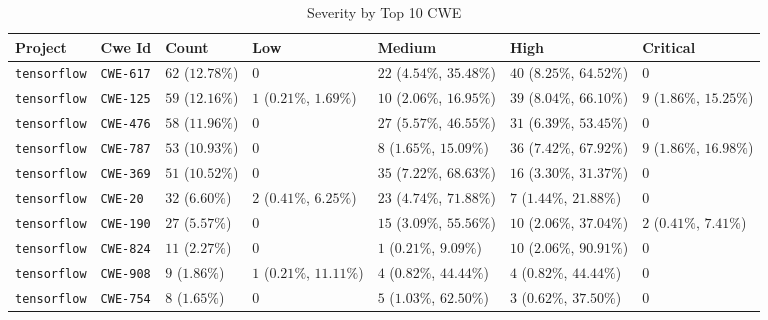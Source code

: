 \begin{table}
\caption{Severity by Top 10 CWE}
\label{tab:cwe-distribution}
\begin{tabular}{lllllll}
\toprule
Project & Cwe Id & Count & Low & Medium & High & Critical \\
\midrule
\texttt{tensorflow} & \texttt{CWE-617} & $62$ ($12.78\%$) & $0$ & $22$ ($4.54\%$, $35.48\%$) & $40$ ($8.25\%$, $64.52\%$) & $0$ \\
\texttt{tensorflow} & \texttt{CWE-125} & $59$ ($12.16\%$) & $1$ ($0.21\%$, $1.69\%$) & $10$ ($2.06\%$, $16.95\%$) & $39$ ($8.04\%$, $66.10\%$) & $9$ ($1.86\%$, $15.25\%$) \\
\texttt{tensorflow} & \texttt{CWE-476} & $58$ ($11.96\%$) & $0$ & $27$ ($5.57\%$, $46.55\%$) & $31$ ($6.39\%$, $53.45\%$) & $0$ \\
\texttt{tensorflow} & \texttt{CWE-787} & $53$ ($10.93\%$) & $0$ & $8$ ($1.65\%$, $15.09\%$) & $36$ ($7.42\%$, $67.92\%$) & $9$ ($1.86\%$, $16.98\%$) \\
\texttt{tensorflow} & \texttt{CWE-369} & $51$ ($10.52\%$) & $0$ & $35$ ($7.22\%$, $68.63\%$) & $16$ ($3.30\%$, $31.37\%$) & $0$ \\
\texttt{tensorflow} & \texttt{CWE-20} & $32$ ($6.60\%$) & $2$ ($0.41\%$, $6.25\%$) & $23$ ($4.74\%$, $71.88\%$) & $7$ ($1.44\%$, $21.88\%$) & $0$ \\
\texttt{tensorflow} & \texttt{CWE-190} & $27$ ($5.57\%$) & $0$ & $15$ ($3.09\%$, $55.56\%$) & $10$ ($2.06\%$, $37.04\%$) & $2$ ($0.41\%$, $7.41\%$) \\
\texttt{tensorflow} & \texttt{CWE-824} & $11$ ($2.27\%$) & $0$ & $1$ ($0.21\%$, $9.09\%$) & $10$ ($2.06\%$, $90.91\%$) & $0$ \\
\texttt{tensorflow} & \texttt{CWE-908} & $9$ ($1.86\%$) & $1$ ($0.21\%$, $11.11\%$) & $4$ ($0.82\%$, $44.44\%$) & $4$ ($0.82\%$, $44.44\%$) & $0$ \\
\texttt{tensorflow} & \texttt{CWE-754} & $8$ ($1.65\%$) & $0$ & $5$ ($1.03\%$, $62.50\%$) & $3$ ($0.62\%$, $37.50\%$) & $0$ \\
\bottomrule
\end{tabular}
\end{table}
